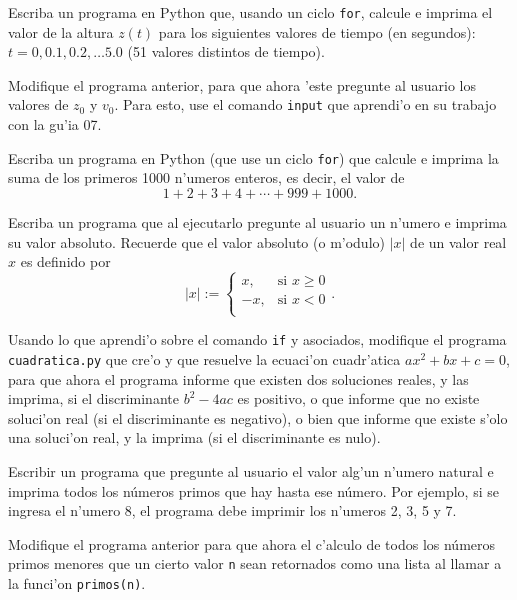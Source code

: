 \documentclass[11pt]{exam}
\begin{document}
\begin{questions}
Escriba un programa en Python que, usando un ciclo \texttt{for}, calcule e imprima el valor de la altura $z(t)$ para los siguientes valores de tiempo (en segundos): $t=0, 0.1, 0.2, \dots 5.0$ (51 valores distintos de tiempo).

\item Modifique el programa anterior, para que ahora 'este pregunte al usuario los valores de $z_0$ y $v_0$. Para esto, use el comando \texttt{input} que aprendi'o en su trabajo con la gu'ia 07.

\item Escriba un programa en Python (que use un ciclo \texttt{for}) que calcule e imprima la suma de los primeros 1000 n'umeros enteros, es decir, el valor de 
\begin{equation}
1 + 2 + 3 + 4  + \cdots + 999 + 1000.
\end{equation}

\item Escriba un programa que al ejecutarlo pregunte al usuario un n'umero e imprima su valor absoluto. Recuerde que el valor absoluto (o m'odulo) $|x|$ de un valor real $x$ es definido por
\begin{equation}
|x|:=\left\{\begin{array}{cl}
x, &\text{si } x\ge 0 \\
-x, & \text{si } x<0 \\
\end{array}\right. .
\end{equation}

\item Usando lo que aprendi'o sobre el comando \texttt{if} y asociados, modifique el programa \texttt{cuadratica.py} que cre'o y que resuelve la ecuaci'on cuadr'atica $ax^2+bx+c=0$, para que ahora el programa informe que existen dos soluciones reales, y las imprima, si el discriminante $b^2-4ac$ es positivo, o que informe que no existe soluci'on real (si el discriminante es negativo), o bien que informe que existe s'olo una soluci'on real, y la imprima (si el discriminante es nulo).

\item Escribir un programa que pregunte al usuario el valor alg'un n'umero natural e imprima todos los números primos que hay hasta ese número. Por ejemplo, si se ingresa el n'umero 8, el programa debe imprimir los n'umeros 2, 3, 5 y 7.

\item Modifique el programa anterior para que ahora el c'alculo de todos los números primos menores que un cierto valor \texttt{n} sean retornados como una lista al llamar a la funci'on \texttt{primos(n)}.
\end{questions}
\end{document}
